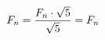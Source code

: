 \documentclass[preview]{standalone}
\begin{document}
\begin{align*}
\special{dvisvgm:raw <g id='unique000'>}F_n = \frac{F_n \cdot \sqrt{5}}{\sqrt{5}} = F_n\special{dvisvgm:raw </g>}
\end{align*}
\end{document}
